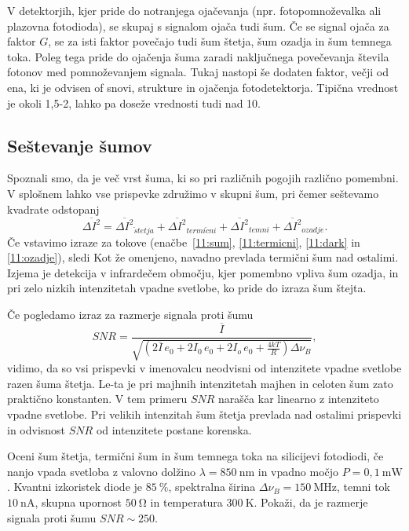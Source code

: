 \begin{remark}
 V detektorjih, kjer pride do notranjega ojačevanja (npr. fotopomnoževalka ali plazovna fotodioda), 
 se skupaj s signalom ojača tudi šum. Če se signal ojača za faktor $G$, se za isti faktor
 povečajo tudi šum štetja, šum ozadja in šum temnega toka. Poleg tega pride do ojačenja šuma
 zaradi naključnega povečevanja števila fotonov med pomnoževanjem signala. Tukaj nastopi
 še dodaten faktor, večji od ena, ki je odvisen of snovi, strukture in ojačenja fotodetektorja. 
 Tipična vrednost je okoli 1,5-2, lahko pa doseže vrednosti tudi nad 10.
\end{remark}

\subsection*{Seštevanje šumov}
Spoznali smo, da je več vrst šuma, ki so pri različnih pogojih različno pomembni. 
V splošnem lahko vse prispevke združimo v skupni šum, pri čemer seštevamo kvadrate
odstopanj
\begin{equation}
\overline{\Delta I^2} = \overline{\Delta I^2}_{\check{s}tetja} + 
\overline{\Delta I^2}_{termi\check{c}ni} + \overline{\Delta I^2}_{temni} + 
\overline{\Delta I^2}_{ozadje}.
\end{equation}
Če vstavimo izraze za tokove (enačbe~\ref{11:sum}, \ref{11:termicni}, \ref{11:dark}
in \ref{11:ozadje}), sledi
Kot že omenjeno, navadno prevlada termični šum nad ostalimi. Izjema je detekcija v
infrardečem območju, kjer pomembno vpliva šum ozadja, in pri zelo nizkih intenzitetah 
vpadne svetlobe, ko pride do izraza šum štejta. 

Če pogledamo izraz za razmerje signala proti šumu
\begin{equation}
SNR = \frac{\overline{I}}{\sqrt{\left( 2 \overline{I}\,e_0 + 2 I_0\,e_0
+ 2 I_o\,e_0 + \frac{4 kT}{R} \right) \Delta\nu_B}},
\end{equation}
vidimo, da so vsi prispevki v imenovalcu neodvisni od intenzitete vpadne svetlobe
razen šuma štetja. Le-ta je pri majhnih intenzitetah majhen in celoten šum 
zato praktično konstanten. V tem primeru $SNR$ narašča kar linearno z intenziteto
vpadne svetlobe. Pri velikih intenzitah šum štetja prevlada nad ostalimi prispevki
in odvisnost $SNR$ od intenzitete postane korenska. 

\begin{definition}
Oceni šum štetja, termični šum in šum temnega toka na silicijevi fotodiodi, če 
nanjo vpada svetloba z valovno dolžino $\lambda=850~\si{\nano\meter}$
in vpadno močjo $P=0,1~\si{\milli\watt}$. Kvantni izkoristek diode je $85~\%$,
spektralna širina $\Delta\nu_B=150~\si{\mega\hertz}$, temni tok $10~\si{\nano\ampere}$,
skupna upornost $50~\si{\ohm}$ in temperatura $300~\si{\kelvin}$. Pokaži, 
da je razmerje signala proti šumu $SNR\sim250$. 
\end{definition}

